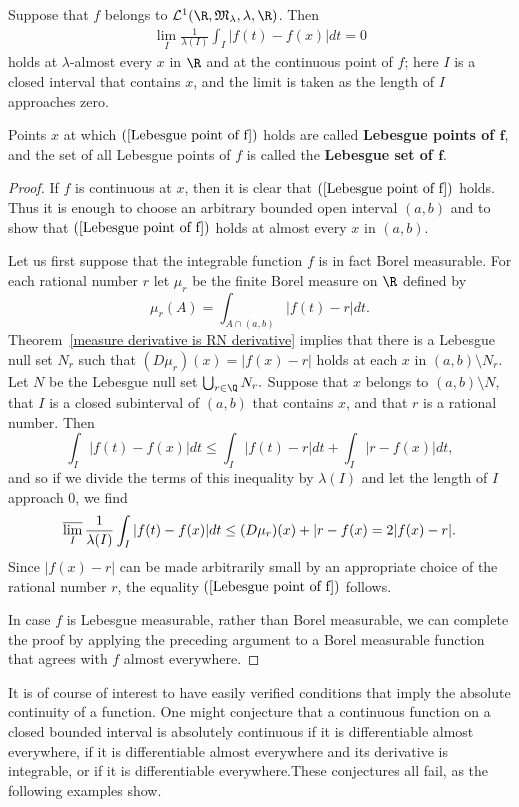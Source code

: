 \begin{proposition}
Suppose that $f$ belongs to $\mathcal{L}^1(\R,\mathfrak{M}_\lambda,\lambda,\R)$. Then
\begin{align}\label{Lebesgue point of f}
\lim_{I}\frac{1}{\lambda(I)}\int_I|f(t)-f(x)|dt=0
\end{align}
holds at $\lambda$-almost every $x$ in $\R$ and at the continuous point of $f$; here $I$ is a closed interval that contains $x$, and the limit is taken as the length of $I$ approaches zero.
\end{proposition}
Points $x$ at which $(\ref{Lebesgue point of f})$ holds are called \textbf{Lebesgue points of $\bm{f}$}, and the set of all Lebesgue points of $f$ is called the \textbf{Lebesgue set of $\bm{f}$}.
\begin{proof}
If $f$ is continuous at $x$, then it is clear that $(\ref{Lebesgue point of f})$ holds. Thus it is enough to choose an arbitrary bounded open interval $(a,b)$ and to show that $(\ref{Lebesgue point of f})$ holds at almost every $x$ in $(a,b)$.\par
Let us first suppose that the integrable function $f$ is in fact Borel measurable. For each rational number $r$ let $\mu_r$ be the finite Borel measure on $\R$ defined by
\[\mu_r(A)=\int_{A\cap(a,b)}|f(t)-r|dt.\]
Theorem~\ref{measure derivative is RN derivative} implies that there is a Lebesgue null set $N_r$ such that $(D\mu_r)(x)=|f(x)-r|$ holds at each $x$ in $(a,b)\setminus N_r$. Let $N$ be the Lebesgue null set $\bigcup_{r\in\Q}N_r.$ Suppose that $x$ belongs to $(a,b)\setminus N$, that $I$ is a closed subinterval of $(a,b)$ that contains $x$, and that $r$ is a rational number. Then
\[\int_I|f(t)-f(x)|dt\leq\int_I|f(t)-r|dt+\int_I|r-f(x)|dt,\]
and so if we divide the terms of this inequality by $\lambda(I)$ and let the length of $I$ approach $0$, we find
\[\varlimsup_I\frac{1}{\lambda(I)}\int_I|f(t)-f(x)|dt\leq(D\mu_r)(x)+|r-f(x)=2|f(x)-r|.\]
Since $|f(x)-r|$ can be made arbitrarily small by an appropriate choice of the rational number $r$, the equality $(\ref{Lebesgue point of f})$ follows.\par
In case $f$ is Lebesgue measurable, rather than Borel measurable, we can complete the proof by applying the preceding argument to a Borel measurable function that agrees with $f$ almost everywhere.
\end{proof}
It is of course of interest to have easily verified conditions that imply the absolute continuity of a function. One might conjecture that a continuous function on a closed bounded interval is absolutely continuous if it is differentiable almost everywhere, if it is differentiable almost everywhere and its derivative is integrable, or if it is differentiable everywhere.These conjectures all fail, as the following examples show.
